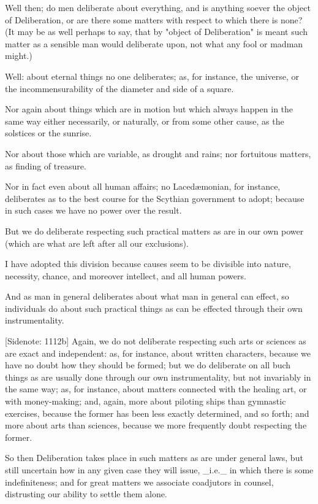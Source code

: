 Well then; do men deliberate about everything, and is anything soever
the object of Deliberation, or are there some matters with respect to
which there is none? (It may be as well perhaps to say, that by "object
of Deliberation" is meant such matter as a sensible man would deliberate
upon, not what any fool or madman might.)

Well: about eternal things no one deliberates; as, for instance, the
universe, or the incommensurability of the diameter and side of a
square.

Nor again about things which are in motion but which always happen in
the same way either necessarily, or naturally, or from some other cause,
as the solstices or the sunrise.

Nor about those which are variable, as drought and rains; nor fortuitous
matters, as finding of treasure.

Nor in fact even about all human affairs; no Lacedæmonian, for instance,
deliberates as to the best course for the Scythian government to adopt;
because in such cases we have no power over the result.

But we do deliberate respecting such practical matters as are in our own
power (which are what are left after all our exclusions).

I have adopted this division because causes seem to be divisible into
nature, necessity, chance, and moreover intellect, and all human powers.

And as man in general deliberates about what man in general can effect,
so individuals do about such practical things as can be effected through
their own instrumentality.

[Sidenote: 1112b] Again, we do not deliberate respecting such arts or
sciences as are exact and independent: as, for instance, about written
characters, because we have no doubt how they should be formed; but we
do deliberate on all buch things as are usually done through our own
instrumentality, but not invariably in the same way; as, for instance,
about matters connected with the healing art, or with money-making; and,
again, more about piloting ships than gymnastic exercises, because the
former has been less exactly determined, and so forth; and more about
arts than sciences, because we more frequently doubt respecting the
former.

So then Deliberation takes place in such matters as are under general
laws, but still uncertain how in any given case they will issue,
_i.e._ in which there is some indefiniteness; and for great matters we
associate coadjutors in counsel, distrusting our ability to settle them
alone.

